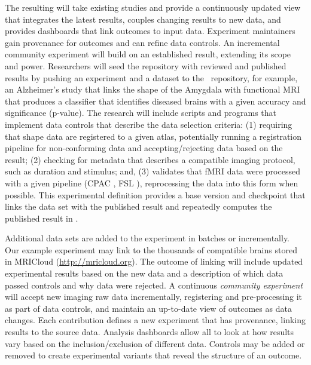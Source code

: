 The resulting {\em \name} will take existing studies and provide a continuously updated view that integrates the latest results, couples changing results to new data, and provides dashboards that link outcomes to input data.  Experiment maintainers gain provenance for outcomes and can
 refine data controls.
An incremental community experiment will build on an established result, extending its scope and power. Researchers will seed the repository with reviewed and published results by pushing an experiment and a dataset to the \name~repository, for example, an Alzheimer’s study that links the shape of the Amygdala with functional MRI that produces a classifier that identifies diseased brains with a given accuracy and significance (p-value). The research will include scripts and programs that implement data controls that describe the data selection criteria: (1) requiring that shape data are registered to a given atlas, potentially running a registration pipeline for non-conforming data and accepting/rejecting data based on the result; (2) checking for metadata that describes a compatible imaging protocol, such as duration and stimulus; and, (3) validates that fMRI data were processed with a given pipeline (CPAC \cite{cpac}, FSL \cite{fsl}), reprocessing the data into this form when possible. This experimental definition provides a base version and checkpoint that links the data set with the published result and repeatedly computes the published result in \name.

Additional data sets are added to the experiment in batches or incrementally. Our example experiment may link to the thousands of compatible brains stored in MRICloud (\url{http://mricloud.org}). The outcome of linking will include updated experimental results based on the new data and a description of which data passed controls and why data were rejected. A continuous {\em community experiment} will accept new imaging raw data incrementally, registering and pre-processing it as part of data controls, and maintain an up-to-date view of outcomes as data changes. Each contribution defines a new experiment that has provenance, linking results to the source data. Analysis dashboards allow all to look at how results vary based on the inclusion/exclusion of different data. Controls may be added or removed to create experimental variants that reveal the structure of an outcome.

